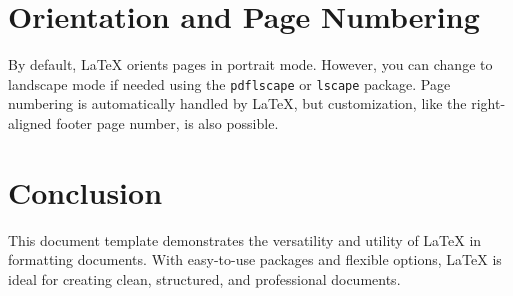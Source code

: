 \documentclass[12pt]{article} %
\begin{document}
\section{Orientation and Page Numbering}
By default, LaTeX orients pages in portrait mode. However, you can change to landscape mode if needed using the \texttt{pdflscape} or \texttt{lscape} package. Page numbering is automatically handled by LaTeX, but customization, like the right-aligned footer page number, is also possible.

\section{Conclusion}
This document template demonstrates the versatility and utility of LaTeX in formatting documents. With easy-to-use packages and flexible options, LaTeX is ideal for creating clean, structured, and professional documents.
\end{document}

